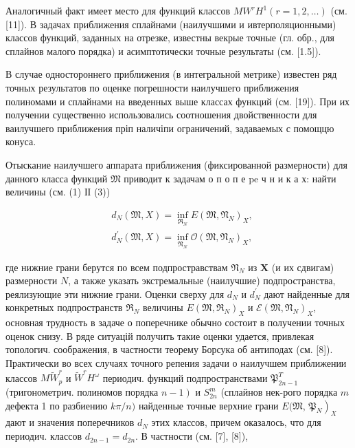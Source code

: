 \documentclass[10pt]{article}
\begin{document}
Аналогичный факт имеет место для функций классов $M W^{r} H^{1}(r=1,2, \ldots)$ (см. [11]). В задачах приближения сплайнами (наилучшими и ивтерполяционными) классов функций, заданных на отрезке, известны векрые точные (гл. обр., для сплайнов малого порядка) и асимптотически точные результаты (см. [1.5]).



В случае одностороннего приближения (в интегральной метрике) известен ряд точных результатов по оценке погрешности наилучшего приближения полиномами и сплайнами на введенных выше классах функций (см. [19]). При их получении существенно использовались соотношения двойственности для ваилучшего приближения пріп наличіпи ограничений, задаваемых с помощцю конуса.



Отыскание наилучшего аппарата приближения (фиксированной размерности) для данного класса функций $\mathfrak{M}$ приводит к задачам о п о п е $\mathrm{pe}$ ч н и к а х: найти величины (см. (1) ІІ (3))



\[

\begin{aligned}

& d_{N}(\mathfrak{M}, X)=\inf _{\mathfrak{R}_{N}} E\left(\mathfrak{M}, \mathfrak{N}_{N}\right)_{X}, \\

& d_{N}^{\prime}(\mathfrak{M}, X)=\inf _{\mathfrak{N}_{N}} \mathscr{O}\left(\mathfrak{M}, \mathfrak{N}_{N}\right)_{X},

\end{aligned}

\]



где нижние грани берутся по всем подпростравствам $\mathfrak{N}_{N}$ из $\boldsymbol{X}$ (и их сдвигам) размерности $N$, а также указать экстремальные (наилучшие) подпространства, реялизующие эти нижние грани. Оценки сверху для $d_{N}$ и $d_{N}^{\prime}$ дают найденные для конкретных подпространств $\mathfrak{R}_{N}$ величины $E\left(\mathfrak{M}, \mathfrak{\Re}_{N}\right)_{X}$ и $\mathscr{E}\left(\mathfrak{M}, \mathfrak{N}_{N}\right)_{X}$, основная трудность в задаче о поперечнике обычно состоит в получении точных оценок снизу. В ряде ситуацій получить такие оценки удается, привлекая топологич. соображения, в частности теорему Борсука об антиподах (см. [8]). Практически во всех случаях точного репения задачи о наилучшем приближении классов $M \tilde{W}_{p}^{r}$ и $\tilde{W}^{r} H^{\omega}$ периодич. функций подпространствами $\mathfrak{P}_{2 n-1}^{T}$ (тригонометрич. полиномов порядка $\left.n-1\right)$ и $S_{2 n}^{m}$ (сплайнов нек-рого порядка $m$ дефекта 1 по разбиению $k \pi / n)$ найденные точные верхние грани $E(\mathfrak{M}$, $\left.\mathfrak{P}_{N}\right)_{X}$ дают и значения поперечников $d_{N}$ этих классов, причем оказалось, что для периодич. классов $d_{2 n-1}=d_{2 n}$. В частности (см. [7], [8]),
\end{document}
